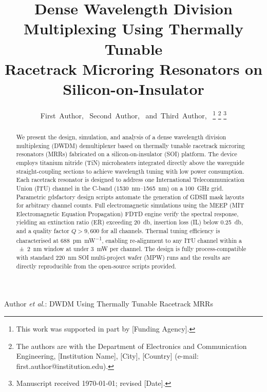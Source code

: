 \documentclass[journal]{IEEEtran}
\begin{document}
\title{Dense Wavelength Division Multiplexing Using Thermally Tunable\\
       Racetrack Microring Resonators on Silicon-on-Insulator}

\author{First~Author,~
        Second~Author,~
        and~Third~Author,~%
\thanks{This work was supported in part by [Funding Agency].}%
\thanks{The authors are with the Department of Electronics and Communication
Engineering, [Institution Name], [City], [Country] (e-mail:
first.author@institution.edu).}%
\thanks{Manuscript received \today; revised [Date].}}

%
{Author \MakeLowercase{\textit{et al.}}: DWDM Using Thermally Tunable Racetrack MRRs}

\maketitle

\begin{abstract}
We present the design, simulation, and analysis of a dense wavelength
division multiplexing (DWDM) demultiplexer based on thermally tunable
racetrack microring resonators (MRRs) fabricated on a silicon-on-insulator
(SOI) platform. The device employs titanium nitride (TiN) microheaters
integrated directly above the waveguide straight-coupling sections to
achieve wavelength tuning with low power consumption. Each racetrack
resonator is designed to address one International Telecommunication Union
(ITU) channel in the C-band (\SIrange{1530}{1565}{\nano\meter}) on a
\SI{100}{\giga\hertz} grid. Parametric gdsfactory design scripts automate
the generation of GDSII mask layouts for arbitrary channel counts. Full
electromagnetic simulations using the MEEP (MIT Electromagnetic Equation
Propagation) FDTD engine verify the spectral response, yielding an
extinction ratio (ER) exceeding \SI{20}{\decibel}, insertion loss (IL)
below \SI{0.25}{\decibel}, and a quality factor $Q > 9{,}600$ for all
channels. Thermal tuning efficiency is characterised at
\SI{688}{\pico\meter\per\milli\watt}, enabling re-alignment to any ITU
channel within a \SI{\pm 2}{\nano\meter} window at under \SI{3}{\milli\watt}
per channel. The design is fully
process-compatible with standard \SI{220}{\nano\meter} SOI multi-project
wafer (MPW) runs and the results are directly reproducible from the
open-source scripts provided.
\end{abstract}
\end{document}
